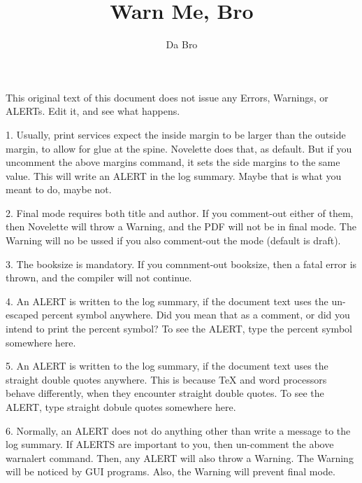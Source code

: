 \documentclass{novelette}
\title{Warn Me, Bro}
\author{Da Bro}
\begin{document}
This original text of this document does not issue any Errors, Warnings,
or ALERTs. Edit it, and see what happens.

1. Usually, print services expect the inside margin to be larger than the
outside margin, to allow for glue at the spine. Novelette does that, as
default. But if you uncomment the above margins command, it sets the side
margins to the same value. This will write an ALERT in the log summary.
Maybe that is what you meant to do, maybe not.

2. Final mode requires both title and author. If you comment-out either
of them, then Novelette will throw a Warning, and the PDF will not be
in final mode. The Warning will no be ussed if you also comment-out
the mode (default is draft).

3. The booksize is mandatory. If you comnment-out booksize, then a fatal error
is thrown, and the compiler will not continue.

4. An ALERT is written to the log summary, if the document text uses the
un-escaped percent symbol anywhere. Did you mean that as a comment, or did you
intend to print the percent symbol? To see the ALERT, type the percent symbol
somewhere here.

5. An ALERT is written to the log summary, if the document text uses the
straight double quotes anywhere. This is because TeX and word processors
behave differently, when they encounter straight double quotes. To see the
ALERT, type straight dobule quotes somewhere here.

6. Normally, an ALERT does not do anything other than write a message to
the log summary. If ALERTS are important to you, then un-comment
the above warnalert command. Then, any ALERT will also throw a Warning.
The Warning will be noticed by GUI programs. Also, the Warning will
prevent final mode.
\end{document}
